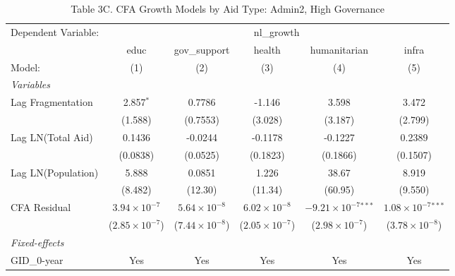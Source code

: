 \begin{table}[htbp]
   \caption{Table 3C. CFA Growth Models by Aid Type: Admin2, High Governance}
   \centering
   \begin{tabular}{lccccc}
      \tabularnewline \midrule \midrule
      Dependent Variable: & \multicolumn{5}{c}{nl\_growth}\\
                         & educ                    & gov\_support            & health                  & humanitarian                   & infra \\   
      Model:             & (1)                     & (2)                     & (3)                     & (4)                            & (5)\\  
      \midrule
      \emph{Variables}\\
      Lag Fragmentation  & 2.857$^{*}$             & 0.7786                  & -1.146                  & 3.598                          & 3.472\\   
                         & (1.588)                 & (0.7553)                & (3.028)                 & (3.187)                        & (2.799)\\   
      Lag LN(Total Aid)  & 0.1436                  & -0.0244                 & -0.1178                 & -0.1227                        & 0.2389\\   
                         & (0.0838)                & (0.0525)                & (0.1823)                & (0.1866)                       & (0.1507)\\   
      Lag LN(Population) & 5.888                   & 0.0851                  & 1.226                   & 38.67                          & 8.919\\   
                         & (8.482)                 & (12.30)                 & (11.34)                 & (60.95)                        & (9.550)\\   
      CFA Residual       & $3.94\times 10^{-7}$    & $5.64\times 10^{-8}$    & $6.02\times 10^{-8}$    & $-9.21\times 10^{-7}$$^{***}$  & $1.08\times 10^{-7}$$^{***}$\\    
                         & ($2.85\times 10^{-7}$)  & ($7.44\times 10^{-8}$)  & ($2.05\times 10^{-7}$)  & ($2.98\times 10^{-7}$)         & ($3.78\times 10^{-8}$)\\    
      \midrule
      \emph{Fixed-effects}\\
      GID\_0-year        & Yes                     & Yes                     & Yes                     & Yes                            & Yes\\  

\end{tabular}
\end{table}
